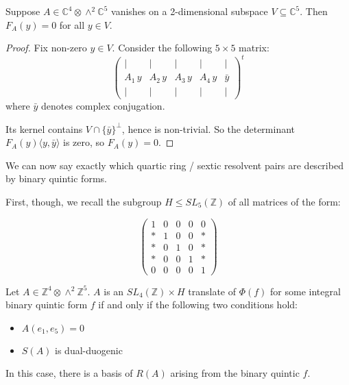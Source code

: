 \documentclass{article}
\begin{document}
\begin{lemma} \label{matrix vanish}
Suppose $A \in \mathbb{C}^4 \otimes \wedge^2 \mathbb{C}^5$ vanishes on a 2-dimensional subspace $V \subseteq \mathbb{C}^5$.  Then $F_A(y) = 0$ for all $y \in V$.
\end{lemma}
\begin{proof}
Fix non-zero $y \in V$.  Consider the following $5 \times 5$ matrix:
\begin{equation}
\begin{pmatrix}
| & | & | & | & | \\
A_1 \, y & A_2 \, y & A_3 \, y & A_4 \, y & \bar{y}  \\
| & | & | & | & |
\end{pmatrix}^t
\end{equation}
where $\bar{y}$ denotes complex conjugation.

Its kernel contains $V \cap \{ \bar{y} \}^\perp$, hence is non-trivial.  So the determinant $F_A(y) \langle y,\bar{y} \rangle$ is zero, so $F_A(y) = 0$.
\end{proof}

We can now say exactly which quartic ring / sextic resolvent pairs are described by binary quintic forms.

First, though, we recall the subgroup $H \leqslant SL_5(\mathbb{Z})$ of all matrices of the form:

\begin{equation}
\begin{pmatrix}
1 & 0 & 0 & 0 & 0 \\
* & 1 & 0 & 0 & * \\
* & 0 & 1 & 0 & * \\
* & 0 & 0 & 1 & * \\
0 & 0 & 0 & 0 & 1
\end{pmatrix}
\end{equation}

\begin{theorem} \label{main theorem}
Let $A \in \mathbb{Z}^4 \otimes \wedge^2 \mathbb{Z}^5$.  $A$ is an $SL_4(\mathbb{Z}) \times H$ translate of $\Phi(f)$ for some integral binary quintic form $f$ if and only if the following two conditions hold:
\begin{itemize}
\item $A(e_1,e_5) = 0$
\item $S(A)$ is dual-duogenic
\end{itemize}
In this case, there is a basis of $R(A)$ arising from the binary quintic $f$.
\end{theorem}
\end{document}
